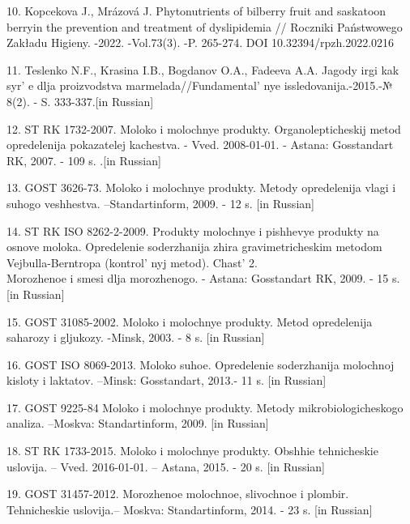 \begin{references}
10. Kopcekova J., Mrázová J. Phytonutrients of bilberry fruit and
saskatoon berryin the prevention and treatment of dyslipidemia //
Roczniki Państwowego Zakładu Higieny. -2022. -Vol.73(3). -P. 265-274.
DOI 10.32394/rpzh.2022.0216

11. Teslenko N.F., Krasina I.B., Bogdanov O.A., Fadeeva A.A. Jagody irgi
kak syr' e dlja proizvodstva
marmelada//Fundamental' nye issledovanija.-2015.-№ 8(2).
- S. 333-337.{[}in Russian{]}

12. ST RK 1732-2007. Moloko i molochnye produkty. Organolepticheskij
metod opredelenija pokazatelej kachestva. - Vved. 2008-01-01. - Astana:
Gosstandart RK, 2007. - 109 s. .{[}in Russian{]}

13. GOST 3626-73. Moloko i molochnye produkty. Metody opredelenija vlagi
i suhogo veshhestva. --Standartinform, 2009. - 12 s. {[}in Russian{]}

14. ST RK ISO 8262-2-2009. Produkty molochnye i pishhevye produkty na
osnove moloka. Opredelenie soderzhanija zhira gravimetricheskim metodom
Vejbulla-Berntropa (kontrol' nyj metod).
Chast'{} 2. \\Morozhenoe i smesi dlja morozhenogo. -
Astana: Gosstandart RK, 2009. - 15 s. {[}in Russian{]}

15. GOST 31085-2002. Moloko i molochnye produkty. Metod opredelenija
saharozy i gljukozy. -Minsk, 2003. - 8 s. {[}in Russian{]}

16. GOST ISO 8069-2013. Moloko suhoe. Opredelenie soderzhanija molochnoj
kisloty i laktatov. --Minsk: Gosstandart, 2013.- 11 s. {[}in Russian{]}

17. GOST 9225-84 Moloko i molochnye produkty. Metody mikrobiologicheskogo
analiza. --Moskva: Standartinform, 2009. {[}in Russian{]}

18. ST RK 1733-2015. Moloko i molochnye produkty. Obshhie tehnicheskie
uslovija. -- Vved. 2016-01-01. -- Astana, 2015. - 20 s. {[}in Russian{]}

19. GOST 31457-2012. Morozhenoe molochnoe, slivochnoe i plombir.
Tehnicheskie uslovija.-- Moskva: Standartinform, 2014. - 23 s. {[}in
Russian{]}
\end{references}

